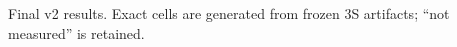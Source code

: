 \begin{table}[t]\centering\scriptsize
\caption{Final v2 results. Exact cells are generated from frozen 3S artifacts; ``not measured'' is retained.}
\resizebox{\textwidth}{!}{}
\end{table}
